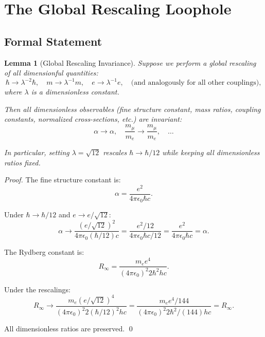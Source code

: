 \documentclass[12pt]{article}
\newtheorem{lemma}[theorem]{Lemma}
\theoremstyle{definition}
\begin{document}
\section{The Global Rescaling Loophole}
\label{sec:loophole}

\subsection{Formal Statement}

\begin{lemma}[Global Rescaling Invariance]
\label{lem:rescaling}
Suppose we perform a global rescaling of all dimensionful quantities:
\begin{equation}
  \hbar \to \lambda^{-2} \hbar, \quad m \to \lambda^{-1} m, \quad e \to \lambda^{-1} e,
  \quad \text{(and analogously for all other couplings)},
\end{equation}
where $\lambda$ is a dimensionless constant.

Then all dimensionless observables (fine structure constant, mass ratios, coupling
constants, normalized cross-sections, etc.) are invariant:
\begin{equation}
  \alpha \to \alpha, \quad \frac{m_\mu}{m_e} \to \frac{m_\mu}{m_e}, \quad \ldots
\end{equation}

In particular, setting $\lambda = \sqrt{12}$ rescales $\hbar \to \hbar/12$ while keeping
all dimensionless ratios fixed.
\end{lemma}

\begin{proof}
The fine structure constant is:
\begin{equation}
  \alpha = \frac{e^2}{4\pi\epsilon_0 \hbar c}.
\end{equation}

Under $\hbar \to \hbar/12$ and $e \to e/\sqrt{12}$:
\begin{equation}
  \alpha \to \frac{(e/\sqrt{12})^2}{4\pi\epsilon_0 (\hbar/12) c}
  = \frac{e^2/12}{4\pi\epsilon_0 \hbar c/12}
  = \frac{e^2}{4\pi\epsilon_0 \hbar c} = \alpha.
\end{equation}

The Rydberg constant is:
\begin{equation}
  R_\infty = \frac{m_e e^4}{(4\pi\epsilon_0)^2 2\hbar^2 hc}.
\end{equation}

Under the rescalings:
\begin{equation}
  R_\infty \to \frac{m_e (e/\sqrt{12})^4}{(4\pi\epsilon_0)^2 2(\hbar/12)^2 hc}
  = \frac{m_e e^4 / 144}{(4\pi\epsilon_0)^2 2 \hbar^2/(144) hc}
  = R_\infty.
\end{equation}

All dimensionless ratios are preserved. \qed
\end{proof}
\end{document}
